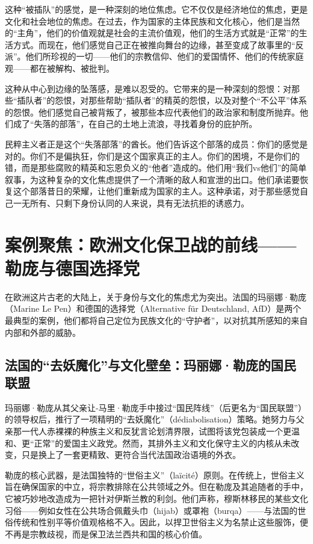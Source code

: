 这种“被插队”的感觉，是一种深刻的地位焦虑。它不仅仅是经济地位的焦虑，更是文化和社会地位的焦虑。在过去，作为国家的主体民族和文化核心，他们是当然的“主角”，他们的价值观就是社会的主流价值观，他们的生活方式就是“正常”的生活方式。而现在，他们感觉自己正在被推向舞台的边缘，甚至变成了故事里的“反派”。他们所珍视的一切——他们的宗教信仰、他们的爱国情怀、他们的传统家庭观——都在被解构、被批判。

这种从中心到边缘的坠落感，是难以忍受的。它带来的是一种深刻的怨恨：对那些“插队者”的怨恨，对那些帮助“插队者”的精英的怨恨，以及对整个“不公平”体系的怨恨。他们感觉自己被背叛了，被那些本应代表他们的政治家和制度所抛弃。他们成了“失落的部落”，在自己的土地上流浪，寻找着身份的庇护所。

民粹主义者正是这个“失落部落”的酋长。他们告诉这个部落的成员：你们的感觉是对的。你们不是偏执狂，你们是这个国家真正的主人。你们的困境，不是你们的错，而是那些腐败的精英和忘恩负义的“他者”造成的。他们用“我们vs他们”的简单叙事，为这种复杂的文化焦虑提供了一个清晰的敌人和宣泄的出口。他们承诺要恢复这个部落昔日的荣耀，让他们重新成为国家的主人。这种承诺，对于那些感觉自己一无所有、只剩下身份认同的人来说，具有无法抗拒的诱惑力。

\section{案例聚焦：欧洲文化保卫战的前线——勒庞与德国选择党}

在欧洲这片古老的大陆上，关于身份与文化的焦虑尤为突出。法国的玛丽娜·勒庞（Marine Le Pen）和德国的选择党（Alternative für Deutschland, AfD）是两个最典型的案例，他们都将自己定位为民族文化的“守护者”，以对抗其所感知的来自内部和外部的威胁。

\subsection{法国的“去妖魔化”与文化壁垒：玛丽娜·勒庞的国民联盟}

玛丽娜·勒庞从其父亲让-马里·勒庞手中接过“国民阵线”（后更名为“国民联盟”）的领导权后，推行了一项精明的“去妖魔化”（dédiabolisation）策略。她努力与父亲那一代人赤裸裸的种族主义和反犹言论划清界限，试图将该党包装成一个更温和、更“正常”的爱国主义政党。然而，其排外主义和文化保守主义的内核从未改变，只是换上了一套更精致、更符合当代法国政治语境的外衣。

勒庞的核心武器，是法国独特的“世俗主义”（laïcité）原则。在传统上，世俗主义旨在确保国家的中立，将宗教排除在公共领域之外。但在勒庞及其追随者的手中，它被巧妙地改造成为一把针对伊斯兰教的利剑。他们声称，穆斯林移民的某些文化习俗——例如女性在公共场合佩戴头巾（hijab）或罩袍（burqa）——与法国的世俗传统和性别平等价值观格格不入。因此，以捍卫世俗主义为名禁止这些服饰，便不再是宗教歧视，而是保卫法兰西共和国的核心价值。

